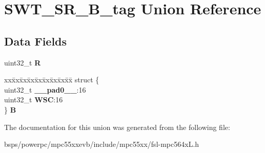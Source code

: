 \hypertarget{unionSWT__SR__32B__tag}{}\section{S\+W\+T\+\_\+\+S\+R\+\_\+B\+\_\+tag Union Reference}
\label{unionSWT__SR__32B__tag}
\subsection*{Data Fields}
\begin{DoxyCompactItemize}
\item 
\mbox{\label{unionSWT__SR__32B__tag_a6c71ab0ea71670024fa97dc9fd688f23}} 
uint32\+\_\+t {\bfseries R}
\item 
\mbox{\label{unionSWT__SR__32B__tag_a4e15a4c9c9773f6cd8960a8236142486}} 
\begin{tabbing}
xx\=xx\=xx\=xx\=xx\=xx\=xx\=xx\=xx\=\kill
struct \{\\
\>uint32\_t {\bfseries \_\_pad0\_\_}:16\\
\>uint32\_t {\bfseries WSC}:16\\
\} {\bfseries B}\\

\end{tabbing}\end{DoxyCompactItemize}


The documentation for this union was generated from the following file\+:\begin{DoxyCompactItemize}
\item 
bsps/powerpc/mpc55xxevb/include/mpc55xx/fsl-\/mpc564x\+L.\+h\end{DoxyCompactItemize}

